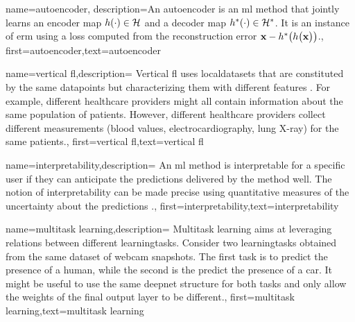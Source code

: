 {name={autoencoder},
	description={An autoencoder is an \gls{ml} method that jointly learns an encoder map 
		$h(\cdot) \in \mathcal{H}$ and a decoder map $h^{*}(\cdot) \in \mathcal{H}^{*}$. 
		It is an instance of \gls{erm} using a \gls{loss} computed from the reconstruction error 
		${\bf x} - h^{*}\big(  h \big( {\bf x} \big) \big)$.},
	first={autoencoder},text={autoencoder}
} 

{name={vertical \gls{fl}},description=
	{Vertical \gls{fl} uses \gls{localdataset}s that are constituted 
	 by the same \gls{datapoint}s but characterizing them with different \gls{feature}s \cite{VFLChapter}. 
     For example, different healthcare providers might all contain information 
     about the same population of patients. However, different healthcare providers 
     collect different measurements (blood values, electrocardiography, lung X-ray) 
     for the same patients.},
	first={vertical \gls{fl}},text={vertical \gls{fl}}
} 

{name={interpretability},description=
		{An \gls{ml} method is interpretable for a specific user if 
			they can anticipate the \gls{prediction}s delivered by the method well. 
			The notion of interpretability can be made precise using quantitative 
			measures of the uncertainty about the \gls{prediction}s \cite{JunXML2020}.},
		first={interpretability},text={interpretability}
}

{name={multitask learning},description=
	{Multitask learning aims at leveraging relations between 
	 different \gls{learningtask}s. Consider two \gls{learningtask}s obtained from the 
	 same \gls{dataset} of webcam snapshots. The first task is to predict the presence 
	 of a human, while the second is the predict the presence of a car. It might be useful 
	 to use the same \gls{deepnet} structure for both tasks and only allow the weights of 
	 the final output layer to be different.},
	first={multitask learning},text={multitask learning}
}

